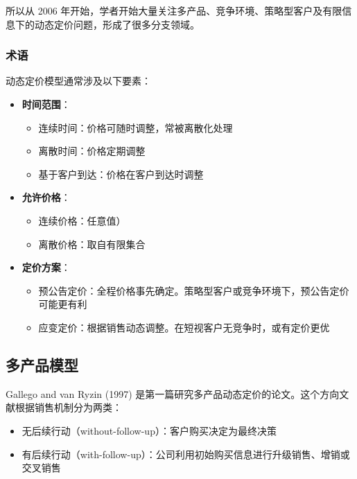 所以从 2006 年开始，学者开始大量关注多产品、竞争环境、策略型客户及有限信息下的动态定价问题，形成了很多分支领域。

\subsubsection{术语}\label{terminology}

动态定价模型通常涉及以下要素：

\begin{itemize}
	\item \textbf{时间范围}：
	\begin{itemize}
		\item 连续时间：价格可随时调整，常被离散化处理
		\item 离散时间：价格定期调整
		\item 基于客户到达：价格在客户到达时调整
	\end{itemize}
	
	\item \textbf{允许价格}：
	\begin{itemize}
		\item 连续价格：任意值）
		\item 离散价格：取自有限集合
	\end{itemize}
	\item \textbf{定价方案}：
	\begin{itemize}
		\item 预公告定价：全程价格事先确定。策略型客户或竞争环境下，预公告定价可能更有利
		\item 应变定价：根据销售动态调整。在短视客户无竞争时，或有定价更优
	\end{itemize}
	
\end{itemize}

\subsection{多产品模型}\label{models-with-multiple-products}

Gallego and van Ryzin (1997) 是第一篇研究多产品动态定价的论文。这个方向文献根据销售机制分为两类：

\begin{itemize}
	\item 无后续行动（without-follow-up）：客户购买决定为最终决策
	\item 有后续行动（with-follow-up）：公司利用初始购买信息进行升级销售、增销或交叉销售
\end{itemize}

